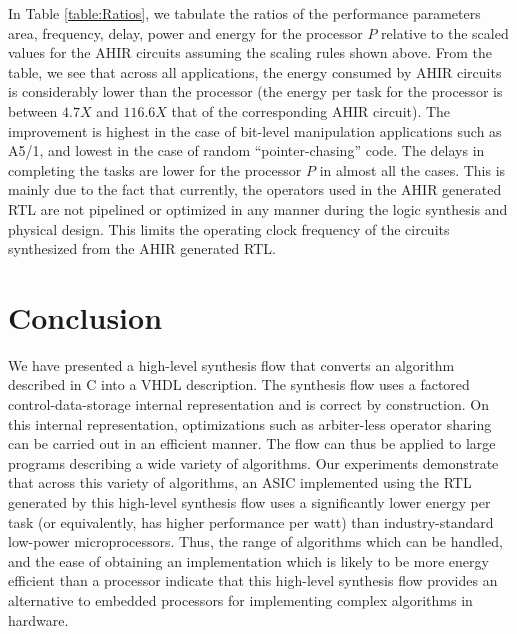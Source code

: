 \documentclass[conference]{IEEEtran}
\begin{document}
In Table \ref{table:Ratios}, we tabulate the ratios of
the performance parameters area, frequency, delay, power
and energy for the processor $P$ relative to the scaled values
for the AHIR circuits assuming the scaling rules shown above.
From the table, we see that across all applications, the energy consumed
by AHIR circuits is considerably lower than the
processor (the energy per task for the processor is
between $4.7X$ and $116.6X$ that of the corresponding AHIR circuit).  
The improvement is highest in the case of
bit-level manipulation applications such as A5/1, and
lowest in the case of random ``pointer-chasing'' code.
The delays in completing the tasks are lower 
for the processor $P$ in almost all the cases.  This
is mainly due to the fact that currently, the operators used in 
the AHIR generated RTL are not pipelined or optimized in any
manner during the logic synthesis and physical
design. This limits the operating clock frequency of the circuits
synthesized from the AHIR generated RTL.  

\section{Conclusion}

We have presented a high-level synthesis flow that converts
an algorithm described in C into a VHDL description.  The
synthesis flow uses a factored control-data-storage internal representation
and is correct by construction.  On this internal
representation, optimizations such as arbiter-less operator sharing 
can be carried out in an efficient manner.  The flow can thus
be applied to large programs describing a wide variety of algorithms.
Our experiments demonstrate that across this variety of
algorithms, an ASIC
implemented using the RTL generated by this high-level
synthesis flow uses a significantly lower energy per task (or equivalently,
has higher performance per watt) than industry-standard low-power microprocessors. 
Thus, the range of algorithms
which can be handled, and the ease of obtaining an implementation
which is likely to be more energy efficient than a processor 
indicate that this high-level synthesis flow provides an 
alternative to embedded processors for implementing complex algorithms in hardware.



\end{document}
